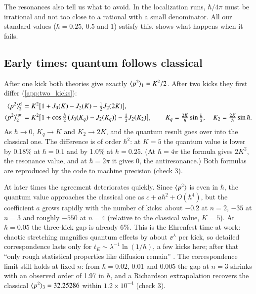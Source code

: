 The resonances also tell us what to avoid. In the localization runs, $\hbar/4\pi$ must be irrational and not
too close to a rational with a small denominator. All our standard values ($\hbar = 0.25$, 0.5 and 1) satisfy
this.  shows what happens when it fails.

\subsection{Early times: quantum follows classical}
\label{sec:early}

After one kick both theories give exactly $\langle p^2 \rangle_1 = K^2/2$. After two kicks they first differ
(\cref{app:two_kicks}):
\begin{align}
  \langle p^2 \rangle_2^{\rm cl} &= K^2\bigl[1 + J_0(K) - J_2(K) - \tfrac12 J_2(2K)\bigr], \label{eq:two_kicks_cl}\\
  \langle p^2 \rangle_2^{\rm qm} &= K^2\bigl[1 + \cos\tfrac{\hbar}{2}\,\bigl(J_0(K_q) - J_2(K_q)\bigr) - \tfrac12 J_2(K_2)\bigr],
  \qquad K_q = \tfrac{2K}{\hbar}\sin\tfrac{\hbar}{2},\quad K_2 = \tfrac{2K}{\hbar}\sin\hbar. \label{eq:two_kicks_qm}
\end{align}
As $\hbar \to 0$, $K_q \to K$ and $K_2 \to 2K$, and the quantum result goes over into the classical one.
The difference is of order $\hbar^2$: at $K = 5$ the quantum value is lower by 0.18\% at $\hbar = 0.1$ and by
1.0\% at $\hbar = 0.25$. (At $\hbar = 4\pi$ the formula gives $2K^2$, the resonance value, and at
$\hbar = 2\pi$ it gives 0, the antiresonance.) Both formulas are reproduced by the code to machine precision
(check 3).

At later times the agreement deteriorates quickly. Since $\langle p^2 \rangle$ is even in $\hbar$, the quantum value
approaches the classical one as $c + a\hbar^2 + O(\hbar^4)$, but the coefficient $a$ grows rapidly with the
number of kicks: about $-0.2$ at $n = 2$, $-35$ at $n = 3$ and roughly $-550$ at $n = 4$ (relative to the
classical value, $K = 5$). At $\hbar = 0.05$ the three-kick gap is already 6\%. This is the Ehrenfest time at
work: chaotic stretching magnifies quantum effects by about $\ee^{\lambda}$ per kick, so detailed
correspondence lasts only for $t_E \sim \lambda^{-1}\ln(1/\hbar)$, a few kicks here; after that ``only rough
statistical properties like diffusion remain'' \cite{Izrailev1990}. The correspondence limit still holds at
fixed $n$: from $\hbar = 0.02$, 0.01 and 0.005 the gap at $n = 3$ shrinks with an observed order of 1.97 in
$\hbar$, and a Richardson extrapolation recovers the classical $\langle p^2 \rangle_3 = 32.25286$ within
$1.2\times10^{-4}$ (check 3).

